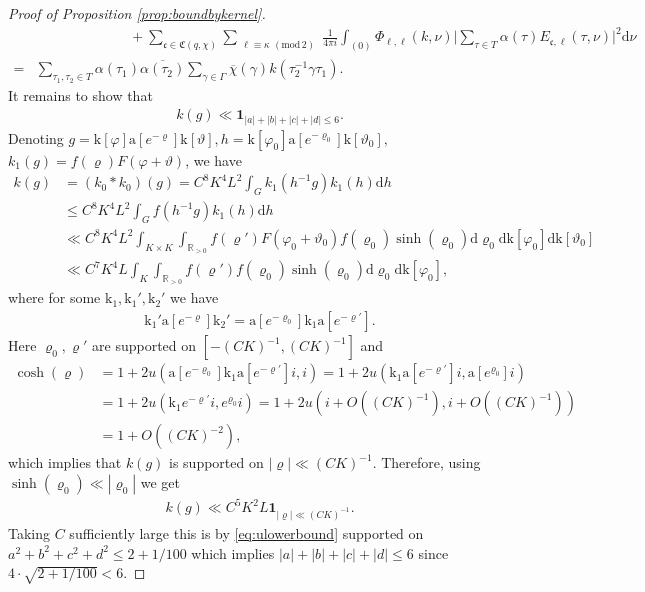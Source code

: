 \documentclass[12pt]{amsart}
\theoremstyle{definition}
\theoremstyle{remark}
\numberwithin{equation}{section}
\newcommand{\R}{{\mathbb R}}
\newcommand{\1}{{\mathbf 1}}
\renewcommand{\a}{\mathrm{a}}
\renewcommand{\k}{\mathrm{k}}
\renewcommand{\d}{\mathrm d}
\renewcommand{\pmod}[1]{\,\,(\mathrm{mod}\,{#1})}
\begin{document}
\begin{proof}[Proof of Proposition \ref{prop:boundbykernel}]
\begin{align*}
      & \hspace{80pt}+ \sum_{\mathfrak{c} \in \mathfrak{C}(q,\chi)} \sum_{\substack{ \ell \equiv \kappa \pmod{2}}} \frac{1}{4 \pi i} \int_{(0)} \Phi_{\ell,\ell}(k,\nu) \bigg| \sum_{\tau \in T }\alpha(\tau) E_{\mathfrak{c},\ell}(\tau,\nu)\bigg|^2 \d \nu \\
      = & \sum_{\tau_1,\tau_2 \in T} \alpha(\tau_1) \overline{\alpha(\tau_2)}\sum_{\gamma \in \Gamma} \overline{\chi}(\gamma)k(\tau_2^{-1} \gamma \tau_1).
 \end{align*}
It remains to show that
\begin{align*}
    k(g) \ll \mathbf{1}_{|a|+|b|+|c|+|d| \leq 6}.
\end{align*}
Denoting $g= \k[\varphi] \a[e^{-\varrho}] \k[\vartheta], h= \k[\varphi_0] \a[e^{-\varrho_0}] \k[\vartheta_0],$ $k_1(g)=f(\varrho) F(\varphi+\vartheta)$, we have
 \begin{align*}
     k(g) &= (k_0 \ast k_0) (g) = C^8 K^{4} L^2 \int_G k_1(h^{-1} g) k_1(h) \d h \\
     &\leq  C^8 K^{4} L^2\int_G f(h^{-1} g) k_1(h) \d h 
     \\
     &\ll  C^8 K^{4} L^2 \int_{K \times  K} \int_{\R_{>0}} f(\varrho') F(\varphi_0 + \vartheta_0 ) f(\varrho_0) \sinh(\varrho_0)\d \varrho_0\d \k[\varphi_0 ]  \d \k[\vartheta_0 ] \\
    & \ll C^7 K^{4} L \int_{K} \int_{\R_{>0}} f(\varrho')  f(\varrho_0) \sinh(\varrho_0)\d \varrho_0\d \k[\varphi_0 ] , 
 \end{align*}
 where for some $\k_1,\k_1',\k_2'$ we have 
 \begin{align*}
     \k_1' \a[e^{-\varrho}] \k_2' = \a[e^{-\varrho_0}]\k_1 \a[e^{-\varrho'}].
 \end{align*}
 Here $\varrho_0,\varrho'$ are supported on $[-(CK)^{-1},(CK)^{-1}]$ and 
 \begin{align*}
     \cosh(\varrho) &= 1+ 2u( \a[e^{-\varrho_0}]\k_1 \a[e^{-\varrho'}] i,i) = 1+ 2u( \k_1 \a[e^{-\varrho'}] i,\a[e^{\varrho_0}]i) \\
     &= 1+ 2u( \k_1  e^{-\varrho'}i, e^{\varrho_0}i) =  1+ 2u( i+ O((CK)^{-1}), i+ O((CK)^{-1})) \\
     & = 1+ O((CK)^{-2}),
 \end{align*}
which implies that $k(g)$ is supported on $|\varrho| \ll (CK)^{-1}$.
Therefore, using $\sinh(\varrho_0) \ll |\varrho_0|$ we get
 \begin{align*}
      k(g) \ll C^5 K^2 L \mathbf{1}_{|\varrho| \ll (CK)^{-1}}.
 \end{align*}
Taking $C$ sufficiently large this is by \eqref{eq:ulowerbound} supported on $a^2+b^2+c^2+d^2 \leq 2+1/100$ which implies  $|a| + |b| +|c| +|d| \leq 6$ since $4 \cdot \sqrt{2+1/100} < 6$.
 \end{proof}
\end{document}
